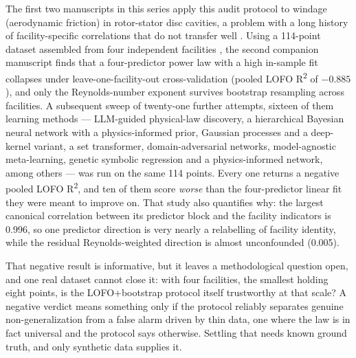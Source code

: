 \documentclass[journal=dce]{CUP-JNL-DTM}%
\begin{document}
The first two manuscripts in this series \citep{gilruiz2026paper1,gilruiz2026paper2} apply this audit protocol to windage (aerodynamic friction) in rotor-stator disc cavities, a problem with a long history of facility-specific correlations that do not transfer well \citep{bayley1969,daily1960}. Using a 114-point dataset assembled from four independent facilities \citep{guo2024,vrancik1968,liu2024,zheng2024}, the second companion manuscript \citep{gilruiz2026paper2} finds that a four-predictor power law with a high in-sample fit collapses under leave-one-facility-out cross-validation (pooled LOFO R\textsuperscript{2} of $-0.885$), and only the Reynolds-number exponent survives bootstrap resampling across facilities. A subsequent sweep of twenty-one further attempts, sixteen of them learning methods --- LLM-guided physical-law discovery, a hierarchical Bayesian neural network with a physics-informed prior, Gaussian processes and a deep-kernel variant, a set transformer, domain-adversarial networks, model-agnostic meta-learning, genetic symbolic regression and a physics-informed network, among others --- was run on the same 114 points. Every one returns a negative pooled LOFO R\textsuperscript{2}, and ten of them score \emph{worse} than the four-predictor linear fit they were meant to improve on. That study also quantifies why: the largest canonical correlation between its predictor block and the facility indicators is 0.996, so one predictor direction is very nearly a relabelling of facility identity, while the residual Reynolds-weighted direction is almost unconfounded (0.005).

That negative result is informative, but it leaves a methodological question open, and one real dataset cannot close it: with four facilities, the smallest holding eight points, is the LOFO+bootstrap protocol itself trustworthy at that scale? A negative verdict means something only if the protocol reliably separates genuine non-generalization from a false alarm driven by thin data, one where the law is in fact universal and the protocol says otherwise. Settling that needs known ground truth, and only synthetic data supplies it.
\end{document}
